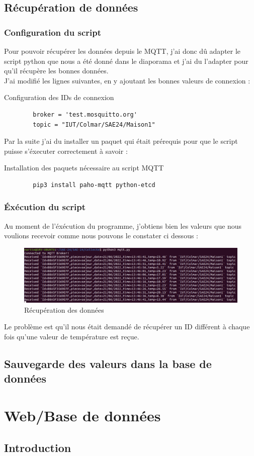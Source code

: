 \documentclass[12pt, a4paper]{article}
\begin{document}
	\subsection{Récupération de données}
		\subsubsection{Configuration du script}
		Pour pouvoir récupérer les données depuis le MQTT, j'ai donc dû
		adapter le script python que nous a été donné dans le diaporama
		et j'ai du l'adapter pour qu'il récupère les bonnes données.\\ 
		J'ai modifié les lignes suivantes, en y ajoutant les bonnes valeurs
		de connexion :
		\begin{listing}[H]
			\caption{Configuration des IDs de connexion}
			\label{lst:id}
			\begin{verbatim}
		broker = 'test.mosquitto.org'
		topic = "IUT/Colmar/SAE24/Maison1"
			\end{verbatim}
		\end{listing}
		Par la suite j'ai du installer un paquet qui était prérequis 
		pour que le script puisse s'éxecuter correctement à savoir :
		\begin{listing}[H]
			\caption{Installation des paquets nécessaire au script MQTT}
			\label{lst:paho}
			\begin{verbatim}
		pip3 install paho-mqtt python-etcd
			\end{verbatim}
		\end{listing}
		\newpage
		\subsubsection{Éxécution du script}
		Au moment de l'éxécution du programme, j'obtiens bien les valeurs que 
		nous voulions recevoir comme nous pouvons le constater ci dessous :
		\begin{figure}[H]
			\centering
			\includegraphics[width=1\textwidth]{img/recup.png}
			\caption{Récupération des données}
			\label{fig:recup}
		\end{figure}
		Le problème est qu'il nous était demandé de récupérer un ID différent
		à chaque fois qu'une valeur de température est reçue.

	\subsection{Sauvegarde des valeurs dans la base de données}


\newpage
\section{Web/Base de données}
\subsection{Introduction}
\end{document}
